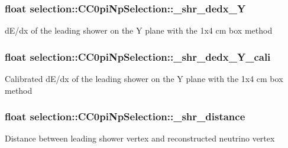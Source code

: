 \subsubsection[{\texorpdfstring{\+\_\+shr\+\_\+dedx\+\_\+Y}{_shr_dedx_Y}}]{\setlength{\rightskip}{0pt plus 5cm}float selection\+::\+C\+C0pi\+Np\+Selection\+::\+\_\+shr\+\_\+dedx\+\_\+Y\hspace{0.3cm}{\ttfamily [private]}}\hypertarget{classselection_1_1CC0piNpSelection_a1af96c31bd3afe4b111f429927bbff1c}{}\label{classselection_1_1CC0piNpSelection_a1af96c31bd3afe4b111f429927bbff1c}
d\+E/dx of the leading shower on the Y plane with the 1x4 cm box method 
\subsubsection[{\texorpdfstring{\+\_\+shr\+\_\+dedx\+\_\+\+Y\+\_\+cali}{_shr_dedx_Y_cali}}]{\setlength{\rightskip}{0pt plus 5cm}float selection\+::\+C\+C0pi\+Np\+Selection\+::\+\_\+shr\+\_\+dedx\+\_\+\+Y\+\_\+cali\hspace{0.3cm}{\ttfamily [private]}}\hypertarget{classselection_1_1CC0piNpSelection_a114f4276a8931d33d8f77fede58398fa}{}\label{classselection_1_1CC0piNpSelection_a114f4276a8931d33d8f77fede58398fa}
Calibrated d\+E/dx of the leading shower on the Y plane with the 1x4 cm box method 
\subsubsection[{\texorpdfstring{\+\_\+shr\+\_\+distance}{_shr_distance}}]{\setlength{\rightskip}{0pt plus 5cm}float selection\+::\+C\+C0pi\+Np\+Selection\+::\+\_\+shr\+\_\+distance\hspace{0.3cm}{\ttfamily [private]}}\hypertarget{classselection_1_1CC0piNpSelection_a20705dc212e16009a0ce4ace27d54af7}{}\label{classselection_1_1CC0piNpSelection_a20705dc212e16009a0ce4ace27d54af7}
Distance between leading shower vertex and reconstructed neutrino vertex 
